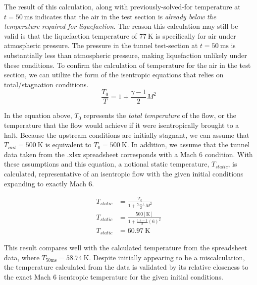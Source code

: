 \documentclass[12pt,letterpaper]{article}
\begin{document}
\begin{enumerate}[label=(\alph*)]
\begin{enumerate}[label=\arabic*.]
			The result of this calculation, along with previously-solved-for temperature at $t = 50 \ \unit{\ms}$ indicates that the air in the test section is \textit{already below the temperature required for liquefaction}.
			The reason this calculation may still be valid is that the liquefaction temperature of $77 \ \unit{\kelvin}$ is specifically for air under atmospheric pressure. 
			The pressure in the tunnel test-section at  $t = 50 \ \unit{\ms}$ is substantially less than atmospheric pressure, making liquefaction unlikely under these conditions.
			To confirm the calculation of temperature for the air in the test section, we can utilize the form of the isentropic equations that relies on total/stagnation conditions.
			\begin{equation*}
				\frac{T_0}{T} = 1 + \frac{\gamma-1}{2}M^2
			\end{equation*}
			
			In the equation above, $T_0$ represents the \textit{total temperature} of the flow, or the temperature that the flow would achieve if it were isentropically brought to a halt.
			Because the upstream conditions are initially stagnant, we can assume that $T_{init} = 500 \ \unit{\kelvin}$ is equivalent to $T_0 = 500 \ \unit{\kelvin}$. 
			In addition, we assume that the tunnel data taken from the .xlsx spreadsheet corresponds with a Mach 6 condition. 
			With these assumptions and this equation, a notional static temperature, $T_{static}$, is calculated, representative of an isentropic flow with the given initial conditions expanding to exactly Mach 6.
			
			\begin{align*}
				T_{static} &= \frac{T_0}{1 + \frac{\gamma-1}{2}M^2}\\
				T_{static} &= \frac{500 \left[\unit{\kelvin}\right]}{1 + \frac{1.4-1}{2}(6)^2}\\
				T_{static} &= 60.97 \ \unit{\kelvin}
			\end{align*}

			This result compares well with the calculated temperature from the spreadsheet data, where $T_{50 \unit{\milli\second}} = 58.74 \ \unit{\kelvin}$.
			Despite initially appearing to be a miscalculation, the temperature calculated from the data is validated by its relative closeness to the exact Mach 6 isentropic temperature for the given initial conditions.
			
		\end{enumerate}


\end{enumerate}
\end{document}

